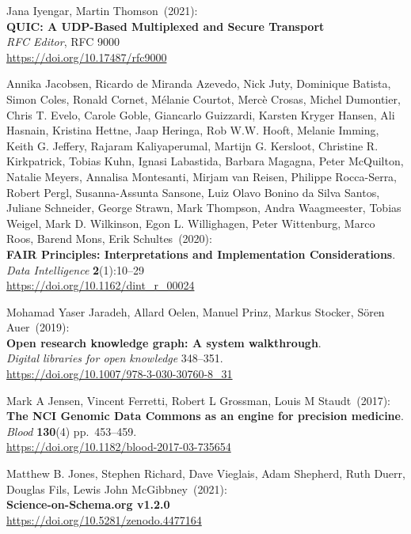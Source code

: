 \begin{thebibliography}{9}
Jana Iyengar, Martin Thomson~(2021): \\
\textbf{{QUIC}: {A UDP-Based Multiplexed} and {Secure Transport}}\\
\emph{RFC Editor}, RFC 9000\\
\url{https://doi.org/10.17487/rfc9000}


Annika Jacobsen, Ricardo de Miranda Azevedo, Nick Juty, Dominique Batista, Simon Coles, Ronald Cornet, Mélanie Courtot, Mercè Crosas, Michel Dumontier, Chris T. Evelo, Carole Goble, Giancarlo Guizzardi, Karsten Kryger Hansen, Ali Hasnain, Kristina Hettne, Jaap Heringa, Rob W.W. Hooft, Melanie Imming, Keith G. Jeffery, Rajaram Kaliyaperumal, Martijn G. Kersloot, Christine R. Kirkpatrick, Tobias Kuhn, Ignasi Labastida, Barbara Magagna, Peter McQuilton, Natalie Meyers, Annalisa Montesanti, Mirjam van Reisen, Philippe Rocca-Serra, Robert Pergl, Susanna-Assunta Sansone, Luiz Olavo Bonino da Silva Santos, Juliane Schneider, George Strawn, Mark Thompson, Andra Waagmeester, Tobias Weigel, Mark D. Wilkinson, Egon L. Willighagen, Peter Wittenburg, Marco Roos, Barend Mons, Erik Schultes~(2020): \\
\textbf{FAIR Principles: Interpretations and Implementation Considerations}.\\
\emph{Data Intelligence} \textbf{2}(1):10--29\\
\url{https://doi.org/10.1162/dint_r_00024}

Mohamad Yaser Jaradeh, Allard Oelen, Manuel Prinz, Markus Stocker, Sören Auer~(2019): \\
\textbf{Open research knowledge graph: A system walkthrough}. \\
\emph{Digital libraries for open knowledge} 348--351.\\
\url{https://doi.org/10.1007/978-3-030-30760-8_31}

Mark A Jensen, Vincent Ferretti, Robert L Grossman, Louis M Staudt~(2017): \\
\textbf{The NCI Genomic Data Commons as an engine for precision medicine}.\\
\emph{Blood} \textbf{130}(4) pp.~453--459.\\
\url{https://doi.org/10.1182/blood-2017-03-735654}

Matthew B. Jones, Stephen Richard, Dave Vieglais, Adam Shepherd, Ruth Duerr, Douglas Fils, Lewis John McGibbney~(2021): \\
\textbf{Science-on-Schema.org v1.2.0}\\
\url{https://doi.org/10.5281/zenodo.4477164}


\end{thebibliography}
